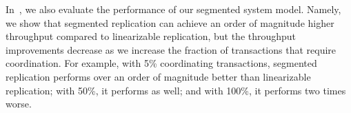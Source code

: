 In~\cite{whittaker2018interactive}, we also evaluate the performance of our
segmented \invariantconfluence{} system model.
%
Namely, we show that segmented \invariantconfluent{} replication can achieve an
order of magnitude higher throughput compared to linearizable replication, but
the throughput improvements decrease as we increase the fraction of
transactions that require coordination. For example, with 5\% coordinating
transactions, segmented \invariantconfluent{} replication performs over an
order of magnitude better than linearizable replication; with 50\%, it performs
as well; and with 100\%, it performs two times worse.
%
